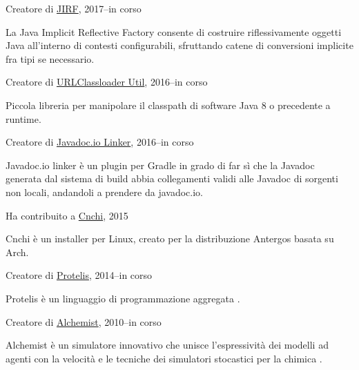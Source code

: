 \documentclass[10pt]{article}
\newenvironment{innerlist}[1][\enskip\textbullet]%
        {\begin{compactitem}[#1]}{\end{compactitem}}
\newcommand{\halfblankline}{\quad\vspace{-0.5\baselineskip}\pagebreak[3]}
\begin{document}
Creatore di \href{https://github.com/DanySK/jirf}{JIRF}, 2017--in corso
\begin{innerlist}
    \item La Java Implicit Reflective Factory consente di costruire riflessivamente oggetti Java all'interno di contesti configurabili, sfruttando catene di conversioni implicite fra tipi se necessario.
\end{innerlist}
\halfblankline

Creatore di \href{https://github.com/DanySK/urlclassloader-util}{URLClassloader Util}, 2016--in corso
\begin{innerlist}
    \item Piccola libreria per manipolare il classpath di software Java 8 o precedente a runtime.
\end{innerlist}
\halfblankline

Creatore di \href{https://github.com/DanySK/javadoc.io-linker}{Javadoc.io Linker}, 2016--in corso
\begin{innerlist}
    \item Javadoc.io linker è un plugin per Gradle in grado di far sì che la Javadoc generata dal sistema di build abbia collegamenti validi alle Javadoc di sorgenti non locali, andandoli a prendere da javadoc.io.
\end{innerlist}
\halfblankline

Ha contribuito a \href{https://github.com/Antergos/Cnchi}{Cnchi}, 2015
\begin{innerlist}
    \item Cnchi è un installer per Linux, creato per la distribuzione Antergos basata su Arch.
\end{innerlist}
\halfblankline

Creatore di \href{http://protelis.org/}{Protelis}, 2014--in corso
\begin{innerlist}
    \item Protelis è un linguaggio di programmazione aggregata \cite{PianiniSAC2015}.
\end{innerlist}
\halfblankline

Creatore di \href{http://alchemist.apice.unibo.it/}{Alchemist}, 2010--in corso
\begin{innerlist}
    \item Alchemist è un simulatore innovativo che unisce l'espressività dei modelli ad agenti con la velocità e le tecniche dei simulatori stocastici per la chimica \cite{PianiniJOS2013}.
\end{innerlist}
\halfblankline
\end{document}
